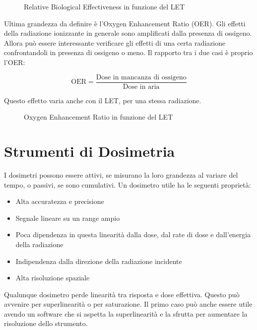 \begin{figure} []
\centering
		\caption{Relative Biological Effectiveness in funzione del LET}
         \label{RBE}
\end{figure}

Ultima grandezza da definire è l'Oxygen Enhancement Ratio (OER). Gli effetti della radiazione ionizzante in generale sono amplificati dalla presenza di ossigeno. Allora può essere interessante verificare gli effetti di una certa radiazione confrontandoli in presenza di ossigeno o meno. Il rapporto tra i due casi è proprio l'OER:

\begin{equation}
\text{OER}=\frac{\text{Dose in mancanza di ossigeno}}{\text{Dose in aria}}
\end{equation}

Questo effetto varia anche con il LET, per una stessa radiazione.

\begin{figure} []
\centering
		\caption{Oxygen Enhancement Ratio in funzione del LET}
         \label{OER}
\end{figure}

\section{Strumenti di Dosimetria} 

I dosimetri possono essere attivi, se misurano la loro grandezza al variare del tempo, o passivi, se sono cumulativi. Un dosimetro utile ha le seguenti proprietà:
\begin{itemize}
\item Alta accuratezza e precisione
\item Segnale lineare su un range ampio
\item Poca dipendenza in questa linearità dalla dose, dal rate di dose e dall'energia della radiazione
\item Indipendenza dalla direzione della radiazione incidente
\item Alta risoluzione spaziale
\end{itemize}

Qualunque dosimetro perde linearità tra risposta e dose effettiva. Questo può avvenire per superlinearità o per saturazione. Il primo caso può anche essere utile avendo un software che si aspetta la superlinearità e la sfrutta per aumentare la risoluzione dello strumento.

